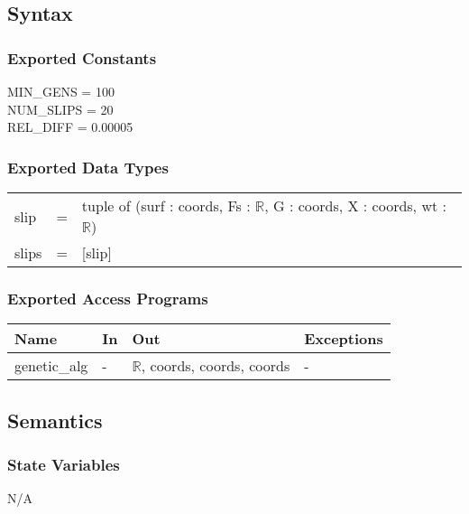 \documentclass[12pt, titlepage]{article}
\begin{document}
\subsection{Syntax}

\subsubsection{Exported Constants}
MIN\_GENS = 100\\
NUM\_SLIPS = 20\\
REL\_DIFF = 0.00005\\

\subsubsection{Exported Data Types}
\renewcommand*{\arraystretch}{1.5}
\begin{longtable}{p{} c p{}}
	slip &=& tuple of (surf : coords, Fs : $\mathbb{R}$, G : coords, X : 
	coords, wt : $\mathbb{R}$) \\
	slips &=& [slip] \\
\end{longtable}

\subsubsection{Exported Access Programs}

\begin{center}
	\renewcommand*{\arraystretch}{1.5}
	\begin{tabular} {p{}  p{}  p{} 
			p{} } \hline 
		\textbf{Name} & \textbf{In} & \textbf{Out} & \textbf{Exceptions} \\ 
		\hline
		
		genetic\_alg & - & $\mathbb{R}$, coords, coords, coords & - \\ \hline
	\end{tabular}
\end{center}

\subsection{Semantics}

\subsubsection{State Variables}
N/A
\end{document}
